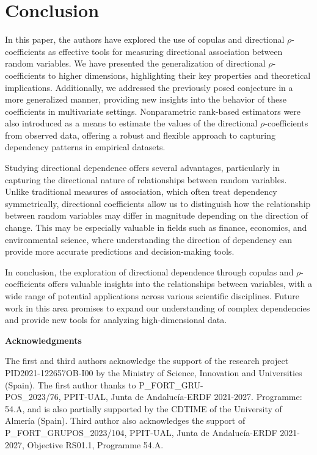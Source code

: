\documentclass[11pt,a4paper]{article}
\begin{document}
\section{Conclusion}\label{sec:conc}
In this paper, the authors have explored the use of copulas and directional $\rho$-coefficients as effective tools for measuring directional association between random variables. We have presented the generalization of directional $\rho$-coefficients to higher dimensions, highlighting their key properties and theoretical implications. Additionally, we addressed the previously posed conjecture in a more generalized manner, providing new insights into the behavior of these coefficients in multivariate settings. Nonparametric rank-based estimators were also introduced as a means to estimate the values of the directional $\rho$-coefficients from observed data, offering a robust and flexible approach to capturing dependency patterns in empirical datasets.

Studying directional dependence offers several advantages, particularly in capturing the directional nature of relationships between random variables. Unlike traditional measures of association, which often treat dependency symmetrically, directional coefficients allow us to distinguish how the relationship between random variables may differ in magnitude depending on the direction of change. This may be especially valuable in fields such as finance, economics, and environmental science, where understanding the direction of dependency can provide more accurate predictions and decision-making tools.

In conclusion, the exploration of directional dependence through copulas and $\rho$-coefficients offers valuable insights into the relationships between variables, with a wide range of potential applications across various scientific disciplines. Future work in this area promises to expand our understanding of complex dependencies and provide new tools for analyzing high-dimensional data.

\bigskip

\noindent
{\bf Acknowledgments}
\medskip

The first and third authors acknowledge the support of the research project PID2021-122657OB-I00
by the Ministry of Science, Innovation and Universities (Spain). The first author thanks to P\_FORT\_GRU-\\ POS\_2023/76, PPIT-UAL, Junta de Andaluc\'ia-ERDF 2021-2027. Programme: 54.A, and is also partially supported by the CDTIME of the University of Almería (Spain). Third author also acknowledges the support of P\_FORT\_GRUPOS\_2023/104, PPIT-UAL, Junta de Andaluc\'ia-ERDF 2021-2027, Objective RS01.1, Programme 54.A.
\end{document}
